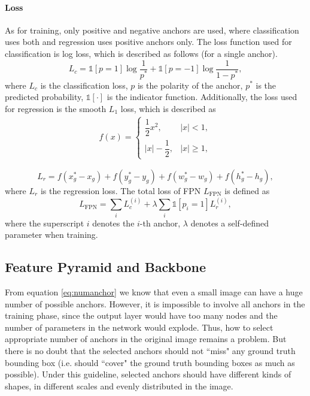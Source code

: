 \paragraph{Loss}
As for training, only positive and negative anchors are used, where classification uses both and regression uses positive anchors only. The loss function used for classification is log loss, which is described as follows (for a single anchor).
\begin{equation}
	L_c = \mathbb{1}[p = 1]\log{\frac{1}{p^*}} + \mathbb{1}[p = -1]\log{\frac{1}{1-p^*}},
\end{equation}
where $L_c$ is the classification loss, $p$ is the polarity of the anchor, $p^*$ is the predicted probability, $\mathbb{1}[\cdot]$ is the indicator function. Additionally, the loss used for regression is the smooth $L_1$ loss, which is described as
\begin{equation}
\begin{aligned}
	f(x) = \begin{cases}
		\dfrac{1}{2}x^2, & \lvert x \rvert < 1, \\
		\lvert x \rvert - \dfrac{1}{2}, & \lvert x \rvert \geqslant 1,
	\end{cases}
\end{aligned}
\end{equation}

\begin{equation}
	L_r = f(x_g^* - x_g) + f(y_g^* - y_g) + f(w_g^* - w_g) + f(h_g^* - h_g),
\end{equation}
where $L_r$ is the regression loss. The total loss of FPN $L_{\text{FPN}}$ is defined as
\begin{equation}
	L_{\text{FPN}} = \sum_{i}^{} L_c^{(i)} + \lambda\sum_{i}^{}\mathbb{1}[p_i = 1]L_r^{(i)},
\end{equation}
where the superscript $i$ denotes the $i$-th anchor, $\lambda$ denotes a self-defined parameter when training.

\subsection{Feature Pyramid and Backbone}\label{fpnbone}

From equation \ref{eq:numanchor} we know that even a small image can have a huge number of possible anchors. However, it is impossible to involve all anchors in the training phase, since the output layer would have too many nodes and the number of parameters in the network would explode. Thus, how to select appropriate number of anchors in the original image remains a problem. But there is no doubt that the selected anchors should not ``miss" any ground truth bounding box (i.e. should ``cover" the ground truth bounding boxes as much as possible). Under this guideline, selected anchors should have different kinds of shapes, in different scales and evenly distributed in the image.


